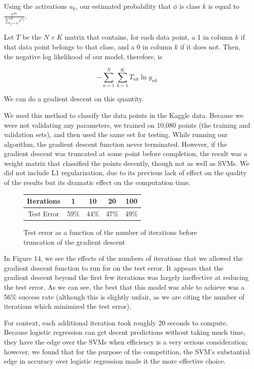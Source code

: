 \documentclass{sigchi}
\begin{document}
Using the activations $a_k$, our estimated probability that $\phi$ is class $k$ is equal to $\frac{e^{a_k}}{\sum_{j=0}^K e^{a_j}}$. 

Let $T$ be the $N \times K$ matrix that contains, for each data point, a 1 in column $k$ if that data point belongs to that class, and a 0 in column $k$ if it does not. Then, the negative log likelihood of our model, therefore, is 

$$-\sum_{n=1}^N \sum_{k=1}^K T_{nk} \ln y_{nk}$$

We can do a gradient descent on this quantity.

We used this method to classify the data points in the Kaggle data. Because we were not validating any parameters, we trained on 10,080 points (the training and validation sets), and then used the same set for testing. While running our algorithm, the gradient descent function never terminated. However, if the gradient descent was truncated at some point before completion, the result was a weight matrix that classified the points decently, though not as well as SVMs. We did not include L1 regularization, due to its previous lack of effect on the quality of the results but its dramatic effect on the computation time.

\renewcommand*{\arraystretch}{1.5}
\begin{figure}
\centering
	\begin{tabular}{| c | c | c | c | c |}
	\hline
	Iterations & 1 & 10 & 20 & 100 \\
	\hline
	Test Error & 59\% & 44\% & 47\% & 49\% \\
	\hline
	\end{tabular}
	\caption{Test error as a function of the number of iterations before truncation of the gradient descent}
\end{figure}

In Figure 14, we see the effects of the numbers of iterations that we allowed the gradient descent function to run for on the test error. It appears that the gradient descent beyond the first few iterations was largely ineffective at reducing the test error. As we can see, the best that this model was able to achieve was a 56\% success rate (although this is slightly unfair, as we are citing the number of iterations which minimized the test error).

For context, each additional iteration took roughly 20 seconds to compute. Because logistic regression can get decent predictions without taking much time, they have the edge over the SVMs when efficiency is a very serious consideration; however, we found that for the purpose of the competition, the SVM's substantial edge in accuracy over logistic regression made it the more effective choice.
\end{document}
